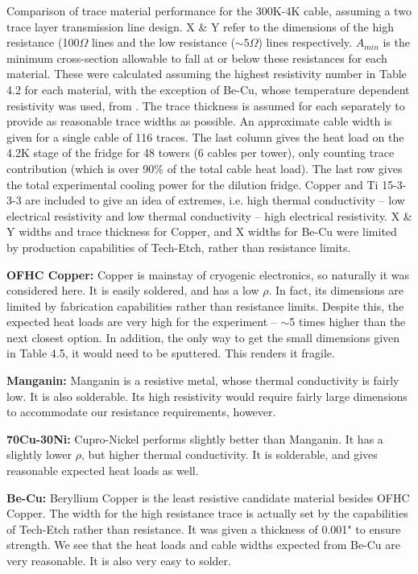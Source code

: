 \documentclass{report}
\begin{document}
\begin{table}[h]
\caption{Comparison of trace material performance for the 300K-4K cable, assuming a two trace layer transmission line design. X \& Y refer to the dimensions of the high resistance (100$\Omega$ lines and the low resistance ($\sim 5\Omega$) lines respectively. $A_{min}$ is the minimum cross-section allowable to fall at or below these resistances for each material. These were calculated assuming the highest resistivity number in Table 4.2 for each material, with the exception of Be-Cu, whose temperature dependent resistivity was used, from \cite{Sciver1986}. The trace thickness is assumed for each separately to provide as reasonable trace widths as possible. An approximate cable width is given for a single cable of 116 traces. The last column gives the  heat load on the 4.2K stage of the fridge for 48 towers (6 cables per tower), only counting trace contribution (which is over 90\% of the total cable heat load). The last row gives the total experimental cooling power for the dilution fridge. Copper and Ti 15-3-3-3 are included to give an idea of extremes, i.e. high thermal conductivity -- low electrical resistivity and low thermal conductivity -- high electrical resistivity. X \& Y widths and trace thickness for Copper, and X widths for Be-Cu were limited by production capabilities of Tech-Etch, rather than resistance limits.}
\end{table}

\textbf{OFHC Copper:} Copper is mainstay of cryogenic electronics, so naturally it was considered here. It is easily soldered, and has a low $\rho$. In fact, its dimensions are limited by fabrication capabilities rather than resistance limits. Despite this, the expected heat loads are very high for the experiment -- $\sim$5 times higher than the next closest option. In addition, the only way to get the small dimensions given in Table 4.5, it would need to be sputtered. This renders it fragile.

\textbf{Manganin:} Manganin is a resistive metal, whose thermal conductivity is fairly low. It is also solderable. Its high resistivity would require fairly large dimensions to accommodate our resistance requirements, however.

\textbf{70Cu-30Ni:} Cupro-Nickel performs slightly better than Manganin. It has a slightly lower $\rho$, but higher thermal conductivity. It is solderable, and gives reasonable expected heat loads as well.

\textbf{Be-Cu:} Beryllium Copper is the least resistive candidate material besides OFHC Copper. The width for the high resistance trace is actually set by the capabilities of Tech-Etch rather than resistance. It was given a thickness of 0.001" to ensure strength. We see that the heat loads and cable widths expected from Be-Cu are very reasonable. It is also very easy to solder.
\end{document}

